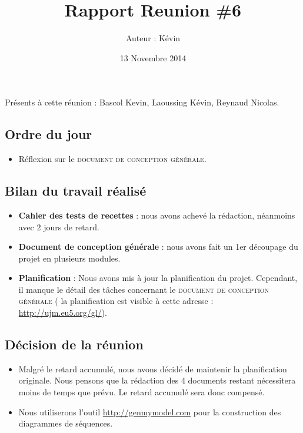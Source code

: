 \documentclass[12pt,a4paper]{article}
\title{Rapport Reunion \#6}
\author{Auteur : Kévin \bsc{LAOUSSING}}
\date{13 Novembre 2014}
\begin{document}
\maketitle

\newpage

Présents à cette réunion : Bascol Kevin, Laoussing Kévin, Reynaud Nicolas.

\subsection*{Ordre du jour}
\begin{itemize}[label = $\blacktriangleright$]
\item Réflexion sur le \textsc{document de conception générale}.
\end{itemize}

\subsection*{Bilan du travail réalisé}

\begin{itemize}[label = $\blacktriangleright$]
\item \textbf{Cahier des tests de recettes} : nous avons achevé la rédaction, néanmoins avec 2 jours de retard.

\item \textbf{Document de conception générale} : nous avons fait un 1er découpage du projet en plusieurs modules.

\item \textbf{Planification} : Nous avons mis à jour la planification du projet. Cependant, il manque le détail des tâches concernant le \textsc{document de conception générale} ( la planification est visible à cette adresse : \url{http://ujm.eu5.org/gl/}).\\

\end{itemize}


\subsection*{Décision de la réunion}

\begin{itemize}[label = $\blacktriangleright$]
\item Malgré le retard accumulé, nous avons décidé de maintenir la planification originale. Nous pensons que la rédaction des 4 documents restant nécessitera moins de temps que prévu. Le retard accumulé sera donc compensé.
\item Nous utiliserons l'outil \url{http://genmymodel.com} pour la construction des diagrammes de séquences.
\end{itemize}
\end{document}
